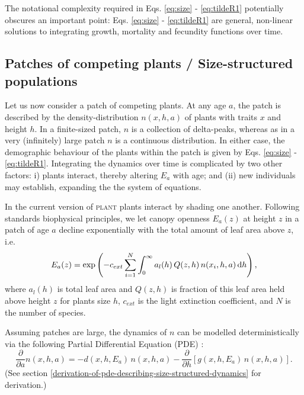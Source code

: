 \documentclass[10pt,twoside]{article}
\newcommand{\plant}{\textsc{plant}}
\begin{document}
The notational complexity required in Eqs. \ref{eq:size} -
\ref{eq:tildeR1} potentially obscures an important point: Eqs.
\ref{eq:size} - \ref{eq:tildeR1} are general, non-linear solutions to
integrating growth, mortality and fecundity functions over time.

\subsection{Patches of competing plants / Size-structured
populations}\label{patches-of-competing-plants-size-structured-populations}

Let us now consider a patch of competing plants. At any age \(a\), the
patch is described by the density-distribution \(n(x,h,a)\) of plants
with traits \(x\) and height \(h\). In a finite-sized patch, \(n\) is a
collection of delta-peaks, whereas as in a very (infinitely) large patch
\(n\) is a continuous distribution. In either case, the demographic
behaviour of the plants within the patch is given by Eqs. \ref{eq:size}
- \ref{eq:tildeR1}. Integrating the dynamics over time is complicated by
two other factors: i) plants interact, thereby altering \(E_a\) with
age; and (ii) new individuals may establish, expanding the the system of
equations.

In the current version of {\plant} plants interact by shading one another.
Following standards biophysical principles, we let canopy openness
\(E_a(z)\) at height \(z\) in a patch of age \(a\) decline exponentially
with the total amount of leaf area above \(z\), i.e.
\begin{equation} \label{eq:light}
  E_a(z) = \exp \left(-c_{ext}  \sum_{i=1}^{N} \int_{0}^{\infty} a_l(h) \, Q(z, h) \, n(x_i,h,a) \, {\rm d}h \right),
\end{equation}
where \(a_l(h)\) is total leaf area and \(Q(z, h)\) is fraction of
this leaf area held above height \(z\) for plants size \(h\),
\(c_{ext}\) is the light extinction coefficient, and \(N\) is the number
of species.

Assuming patches are large, the dynamics of \(n\) can be modelled
deterministically via the following Partial Differential Equation (PDE)
\citep{Kohyama-1993, Deroos-1997, Moorcroft-2001}:
\begin{equation} \label{eq:PDE} 
  \frac{\partial }{\partial a} n(x,h,a)= -d(x,h, E_a) \, n(x,h,a)-\frac{\partial }{\partial h} \left[g(x,h,E_a) \, n(x,h,a)\right].
\end{equation}
(See section \ref{derivation-of-pde-describing-size-structured-dynamics} for derivation.)
\end{document}
